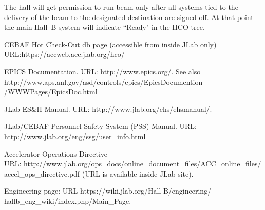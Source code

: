 \documentclass[12pt]{report}
\begin{document}
The hall will get permission to run beam only after all systems tied to the delivery of the 
beam to the designated destination are signed off. At that point the main Hall~B system will 
indicate ``Ready" in the HCO tree.





































\begin{thebibliography}{99}
 CEBAF Hot Check-Out db page (accessible from inside JLab only)
URL:https://accweb.acc.jlab.org/hco/

EPICS Documentation. URL: http://www.epics.org/. 
See also http://www.aps.anl.gov/asd/controls/epics/EpicsDocumention\\/WWWPages/EpicsDoc.html

JLab ES\&H Manual. URL: http://www.jlab.org/ehs/ehsmanual/.

JLab/CEBAF Personnel Safety System (PSS) Manual. URL: http://www.jlab.org/eng/ssg/user\_info.html

Accelerator Operations Directive \\
URL: http://www.jlab.org/ops\_docs/online\_document\_files/ACC\_online\_files/\\accel\_ops\_directive.pdf (URL is available inside JLab site).

Engineering page: URL https://wiki.jlab.org/Hall-B/engineering/\\hallb\_eng\_wiki/index.php/Main\_Page.

\end{thebibliography}
\end{document}
